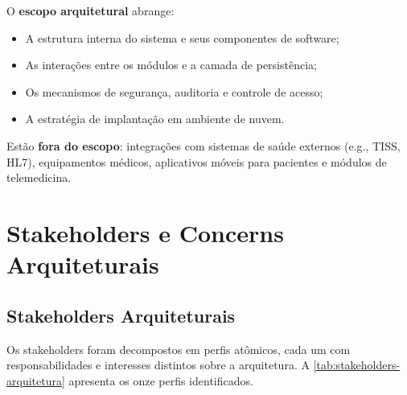 O \textbf{escopo arquitetural} abrange:
\begin{itemize}
    \item A estrutura interna do sistema e seus componentes de software;
    \item As interações entre os módulos e a camada de persistência;
    \item Os mecanismos de segurança, auditoria e controle de acesso;
    \item A estratégia de implantação em ambiente de nuvem.
\end{itemize}

Estão \textbf{fora do escopo}: integrações com sistemas de saúde externos (e.g., TISS, HL7), equipamentos médicos, aplicativos móveis para pacientes e módulos de telemedicina.

\section{Stakeholders e Concerns Arquiteturais}
 
\subsection{Stakeholders Arquiteturais}
 
Os stakeholders foram decompostos em perfis atômicos, cada um com responsabilidades
e interesses distintos sobre a arquitetura. A \autoref{tab:stakeholders-arquitetura}
apresenta os onze perfis identificados.
 
